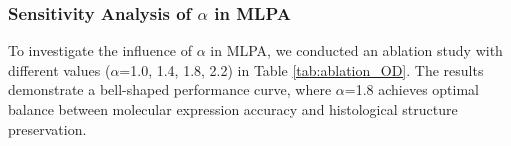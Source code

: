 \documentclass[journal,twoside,web]{ieeecolor}
\newcommand{\revision}[1]{\textcolor{revisioncolor}{#1}}  %
\renewcommand{\revision}[1]{#1}%
\begin{document}
\subsubsection{Sensitivity Analysis of $\alpha$ in MLPA}
To investigate the influence of $\alpha$ in MLPA, we conducted an ablation study with different values ($\alpha$=1.0, 1.4, 1.8, 2.2) in Table \ref{tab:ablation_OD}. The results demonstrate a bell-shaped performance curve, where $\alpha$=1.8 achieves optimal balance between molecular expression accuracy and histological structure preservation.

\begin{table}[ht]
  \centering
  \setlength\tabcolsep{2pt}
  \renewcommand{\arraystretch}{1.0}
  \caption{\revision{ABLATION STUDY OF FOD $\alpha$ ON MIST DATASET. THE BEST SCORES ARE HIGHLIGHTED IN BOLD.}}
  \label{tab:ablation_OD}

\end{table}
\end{document}
